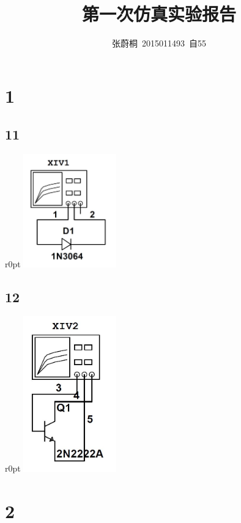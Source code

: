 \documentclass[UTF8,a4paper,12pt]{ctexart}
\title{第一次仿真实验报告}
\author{张蔚桐\ 2015011493\ 自55}
\begin{document}
\maketitle
\section{1}
\subsection{11}
\begin {wrapfigure}{r}{0pt}
\includegraphics [width=40mm]{cap/8.JPG}
\end {wrapfigure}






\subsection{12}
\begin {wrapfigure}{r}{0pt}
\includegraphics [width=40mm]{cap/9.JPG}
\end {wrapfigure}




\section{2}
\end{document}
